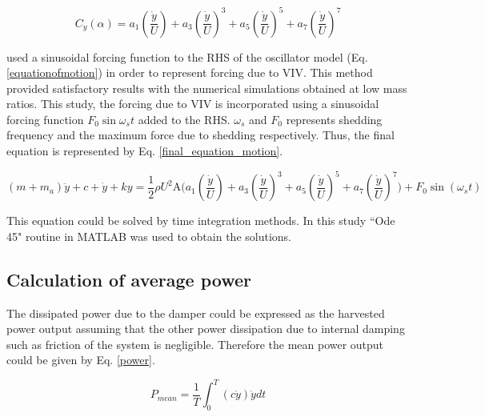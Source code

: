 \begin{equation}
\label{cy ploynomial}
C_y(\alpha)=a_1\left(\frac{\dot{y}}{U}\right)+a_3\left(\frac{\dot{y}}{U}\right)^3+a_5\left(\frac{\dot{y}}{U}\right)^5+a_7\left(\frac{\dot{y}}{U}\right)^7
\end{equation}


\cite{Joly2012} used a sinusoidal forcing function to the RHS of the oscillator model (Eq. \eqref{equationofmotion}) in order to represent forcing due to VIV. This method provided satisfactory results with the numerical simulations obtained at low mass ratios. This study, the forcing due to VIV is incorporated using a sinusoidal forcing function $F_0\sin{\omega_{s}t}$ added to the RHS. $\omega_{s}$ and $F_0$ represents shedding frequency and the maximum force due to shedding respectively. Thus, the final equation is represented by Eq. \eqref{final_equation_motion}.    

\begin{equation}
\label{final_equation_motion}
(m{+}m_a)\ddot{y}{+}c{+}\dot{y}{+}ky{=}\frac{1}{2}\rho U^2 \text{A} \Bigg(a_1\left(\frac{\dot{y}}{U}\right){+}a_3\left(\frac{\dot{y}}{U}\right)^3{+}a_5\left(\frac{\dot{y}}{U}\right)^5{+}a_7\left(\frac{\dot{y}}{U}\right)^7 \Bigg){+} F_0\sin{(\omega_s t)}
\end{equation}

This equation could be solved by time integration methods. In  this study  ``Ode 45" routine in MATLAB was used to obtain the solutions.

\subsection{Calculation of average power}

 The dissipated power due to the damper could be expressed as the harvested power output assuming that the other  power dissipation due to internal damping such as friction of the system is negligible. Therefore the mean power output could be given by Eq. \eqref{power}. 
  
 
 \begin{equation}
 \label{power}
P_{mean}=\frac{1}{T}\int_{0}^{T}(c\dot{y})\dot{y} dt
 \end{equation}
 
 
 \vspace{20mm}
 
 
